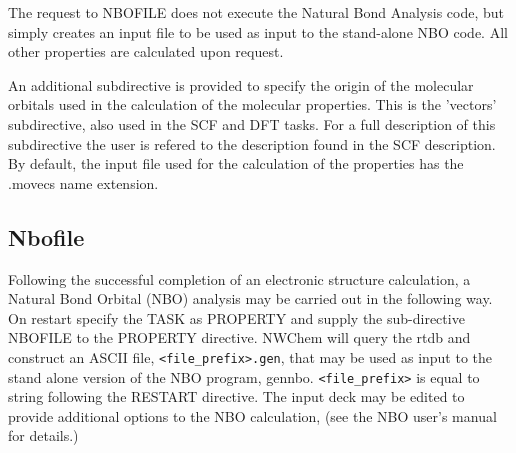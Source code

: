 The request to NBOFILE does not execute the Natural Bond Analysis
code, but simply creates an input file to be used as input to the
stand-alone NBO code. All other properties are calculated upon
request.

An additional subdirective is provided to specify the origin of the
molecular orbitals used in the calculation of the molecular
properties. This is the 'vectors' subdirective, also used in the
SCF and DFT tasks. For a full description of this subdirective
the user is refered to the description found in the SCF description.
By default, the input file used for the calculation of the properties
has the .movecs name extension. 

\subsection{Nbofile}

Following the successful completion of an electronic structure
calculation, a Natural Bond Orbital (NBO) analysis may be carried out
in the following way.  On restart specify the TASK as PROPERTY and
supply the sub-directive NBOFILE to the PROPERTY directive.  NWChem
will query the rtdb and construct an ASCII file,
\verb+<file_prefix>.gen+, that may be used as input to the stand alone
version of the NBO program, gennbo.  \verb+<file_prefix>+ is equal to
string following the RESTART directive.  The input deck may be edited
to provide additional options to the NBO calculation, (see the NBO
user's manual for details.)

